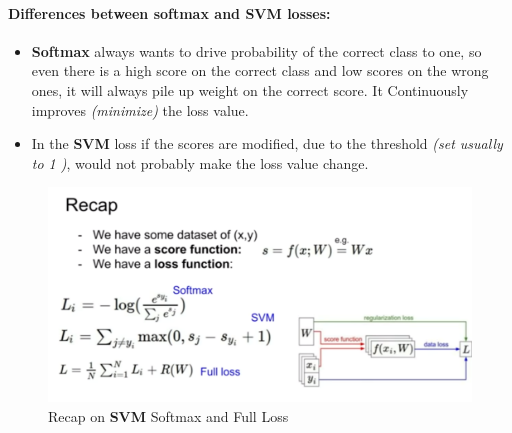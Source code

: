 \documentclass[11pt]{article}
\begin{document}
\paragraph{Differences between softmax and SVM losses:}
\begin{itemize}
    \item \textbf{Softmax} always wants to drive probability of the correct class to one, so even there is a high score on the correct class and low scores on the wrong ones, it will always pile up weight on the correct score. It Continuously improves \textit{(minimize)} the loss value.
    \item In the \textbf{SVM} loss if  the scores are modified, due to the threshold \textit{(set usually to 1 )},  would not probably  make the loss value change.
\end{itemize}{}
\clearpage
\begin{figure}[h]
\centering
\captionsetup{justification=centering}
\includegraphics[width=0.75\linewidth]{L216.pdf}
\caption{ Recap on \textbf{SVM} Softmax and Full Loss}
\label{fig:L216}
\end{figure}
\end{document}
